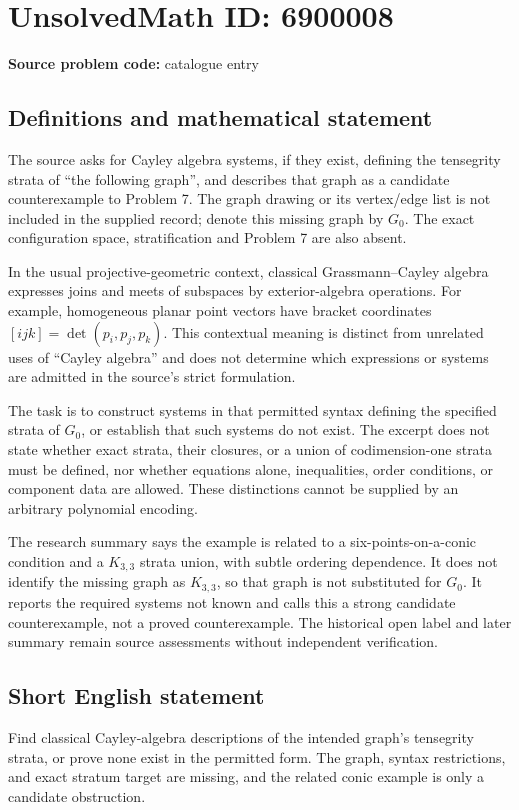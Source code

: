 \documentclass[11pt]{article}
\begin{document}
\section*{UnsolvedMath ID: 6900008}
\textbf{Source problem code:} catalogue entry
\subsection{Definitions and mathematical statement}
The source asks for Cayley algebra systems, if they exist, defining the tensegrity strata of ``the following graph'', and describes that graph as a candidate counterexample to Problem 7. The graph drawing or its vertex/edge list is not included in the supplied record; denote this missing graph by \(G_0\). The exact configuration space, stratification and Problem 7 are also absent.

In the usual projective-geometric context, classical Grassmann--Cayley algebra expresses joins and meets of subspaces by exterior-algebra operations. For example, homogeneous planar point vectors have bracket coordinates \([ijk]=\det(p_i,p_j,p_k)\). This contextual meaning is distinct from unrelated uses of ``Cayley algebra'' and does not determine which expressions or systems are admitted in the source's strict formulation.

The task is to construct systems in that permitted syntax defining the specified strata of \(G_0\), or establish that such systems do not exist. The excerpt does not state whether exact strata, their closures, or a union of codimension-one strata must be defined, nor whether equations alone, inequalities, order conditions, or component data are allowed. These distinctions cannot be supplied by an arbitrary polynomial encoding.

The research summary says the example is related to a six-points-on-a-conic condition and a \(K_{3,3}\) strata union, with subtle ordering dependence. It does not identify the missing graph as \(K_{3,3}\), so that graph is not substituted for \(G_0\). It reports the required systems not known and calls this a strong candidate counterexample, not a proved counterexample. The historical open label and later summary remain source assessments without independent verification.
\subsection{Short English statement}
Find classical Cayley-algebra descriptions of the intended graph's tensegrity strata, or prove none exist in the permitted form. The graph, syntax restrictions, and exact stratum target are missing, and the related conic example is only a candidate obstruction.
\end{document}
